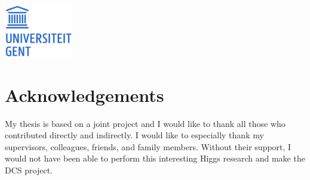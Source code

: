 \documentclass[10pt,a4paper,twoside,openright,dutch,english]{book}
\begin{document}
 \normalsize
% 

 \noindent
 \begin{minipage}{2cm}%
   \includegraphics*[width=3cm]{fig/ugent.png}%
 \end{minipage}\hfill
 



\clearpage{\pagestyle{empty}\cleardoublepage}
\thispagestyle{empty}
 


\frontmatter
\chapter{Acknowledgements}

My thesis is based on a joint project and I would like to thank all those who contributed directly and indirectly. I would like to especially thank my supervisors, colleagues, friends, and family members. Without their support, I would not have been able to perform this interesting Higgs research and make the DCS project.
\end{document}
